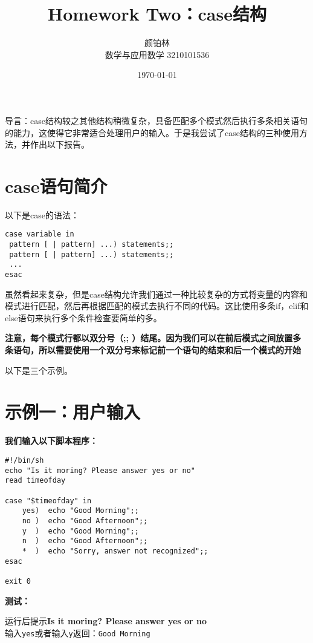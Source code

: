 \documentclass{ctexart}
\title{Homework Two：case结构}
\author{颜铂林 \\ 数学与应用数学 3210101536}
\date\today
\begin{document}
\begin{sloppypar}

\maketitle

导言：case结构较之其他结构稍微复杂，具备匹配多个模式然后执行多条相关语句的能力，这使得它非常适合处理用户的输入。于是我尝试了case结构的三种使用方法，并作出以下报告。

\section{case语句简介}
以下是case的语法：

\begin{verbatim}
case variable in
 pattern [ | pattern] ...) statements;;
 pattern [ | pattern] ...) statements;;
 ...
esac
\end{verbatim}

虽然看起来复杂，但是case结构允许我们通过一种比较复杂的方式将变量的内容和模式进行匹配，然后再根据匹配的模式去执行不同的代码。这比使用多条if，elif和else语句来执行多个条件检查要简单的多。

{\bfseries 注意，每个模式行都以双分号（;; ）结尾。因为我们可以在前后模式之间放置多条语句，所以需要使用一个双分号来标记前一个语句的结束和后一个模式的开始}

以下是三个示例。
\section{示例一：用户输入}

{\bfseries 我们输入以下脚本程序：}

\begin{verbatim}
#!/bin/sh
echo "Is it moring? Please answer yes or no"
read timeofday

case "$timeofday" in
    yes)  echo "Good Morning";;
    no )  echo "Good Afternoon";;
    y  )  echo "Good Morning";;
    n  )  echo "Good Afternoon";;
    *  )  echo "Sorry, answer not recognized";;
esac

exit 0
\end{verbatim}

{\bfseries 测试：}

运行后提示{\bfseries Is it moring? Please answer yes or no}\\

输入\verb|yes|或者输入\verb|y|返回：\verb|Good Morning|\\


\end{sloppypar}
\end{document}
